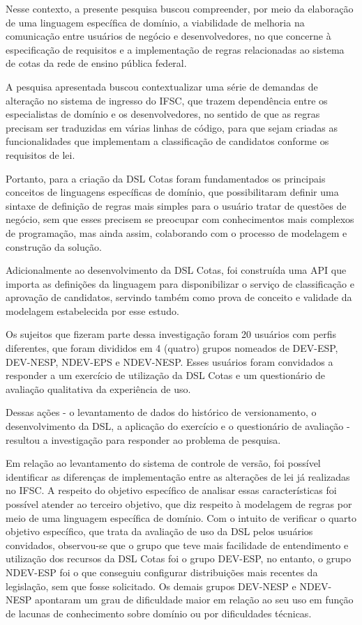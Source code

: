 Nesse contexto, a presente pesquisa buscou compreender, por meio da elaboração de uma linguagem específica de domínio, a viabilidade de melhoria na comunicação entre usuários de negócio e desenvolvedores, no que concerne à especificação de requisitos e a implementação de regras relacionadas ao sistema de cotas da rede de ensino pública federal.

A pesquisa apresentada buscou contextualizar uma série de demandas de alteração no sistema de ingresso do \gls{IFSC}, que trazem dependência entre os especialistas de domínio e os desenvolvedores, no sentido de que as regras precisam ser traduzidas em várias linhas de código, para que sejam criadas as funcionalidades que implementam a classificação de candidatos conforme os requisitos de lei.

Portanto, para a criação da DSL Cotas foram fundamentados os principais conceitos de linguagens específicas de domínio, que possibilitaram definir uma sintaxe de definição de regras mais simples para o usuário tratar de questões de negócio, sem que esses precisem se preocupar com conhecimentos mais complexos de programação, mas ainda assim, colaborando com o processo de modelagem e construção da solução.

Adicionalmente ao desenvolvimento da DSL Cotas, foi construída uma \gls{API} que importa as definições da linguagem para disponibilizar o serviço de classificação e aprovação de candidatos, servindo também como prova de conceito e validade da modelagem estabelecida por esse estudo.

Os sujeitos que fizeram parte dessa investigação foram 20 usuários com perfis diferentes, que foram divididos em 4 (quatro) grupos nomeados de DEV-ESP, DEV-NESP, NDEV-EPS e NDEV-NESP. Esses usuários foram convidados a responder a um exercício de utilização da DSL Cotas e um questionário de avaliação qualitativa da experiência de uso. 
 
Dessas ações - o levantamento de dados do histórico de versionamento, o desenvolvimento da DSL, a aplicação do exercício e o questionário de avaliação - resultou a investigação para responder ao problema de pesquisa. 

Em relação ao levantamento do sistema de controle de versão, foi possível identificar as diferenças de implementação entre as alterações de lei já realizadas no \gls{IFSC}. A respeito do objetivo específico de analisar essas características foi possível atender ao terceiro objetivo, que diz respeito à modelagem de regras por meio de uma linguagem específica de domínio. Com o intuito de verificar o quarto objetivo específico, que trata da avaliação de uso da DSL pelos usuários convidados, observou-se que o grupo que teve mais facilidade de entendimento e utilização dos recursos da DSL Cotas foi o grupo DEV-ESP, no entanto, o grupo NDEV-ESP foi o que conseguiu configurar distribuições mais recentes da legislação, sem que fosse solicitado. Os demais grupos DEV-NESP e NDEV-NESP apontaram um grau de dificuldade maior em relação ao seu uso em função de lacunas de conhecimento sobre domínio ou por dificuldades técnicas.

